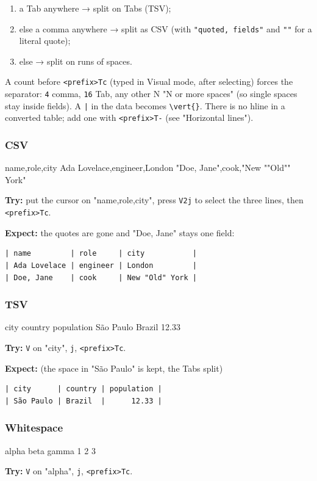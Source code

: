 \begin{enumerate}
\item a Tab anywhere → split on Tabs (TSV);
\item else a comma anywhere → split as CSV (with \texttt{"quoted, fields"} and \texttt{""}
for a literal quote);
\item else → split on runs of spaces.
\end{enumerate}

A count before \texttt{<prefix>Tc} (typed in Visual mode, after selecting) forces
the separator: \texttt{4} comma, \texttt{16} Tab, any other N "N or more spaces" (so
single spaces stay inside fields). A \texttt{|} in the data becomes \texttt{\textbackslash{}vert\{\}}.
There is no hline in a converted table; add one with \texttt{<prefix>T-}
(see "Horizontal lines").
\subsubsection{CSV}
\label{sec:org15303e2}
name,role,city
Ada Lovelace,engineer,London
"Doe, Jane",cook,"New ""Old"" York"

\textbf{Try:} put the cursor on "name,role,city", press \texttt{V2j} to select the three
lines, then \texttt{<prefix>Tc}.

\textbf{Expect:} the quotes are gone and "Doe, Jane" stays one field:
\begin{verbatim}
| name         | role     | city           |
| Ada Lovelace | engineer | London         |
| Doe, Jane    | cook     | New "Old" York |
\end{verbatim}
\subsubsection{TSV}
\label{sec:orgcc47755}
city	country	population
São Paulo	Brazil	12.33

\textbf{Try:} \texttt{V} on "city", \texttt{j}, \texttt{<prefix>Tc}.

\textbf{Expect:} (the space in "São Paulo" is kept, the Tabs split)
\begin{verbatim}
| city      | country | population |
| São Paulo | Brazil  |      12.33 |
\end{verbatim}
\subsubsection{Whitespace}
\label{sec:orgd42c180}
alpha beta   gamma
1 2       3

\textbf{Try:} \texttt{V} on "alpha", \texttt{j}, \texttt{<prefix>Tc}.

